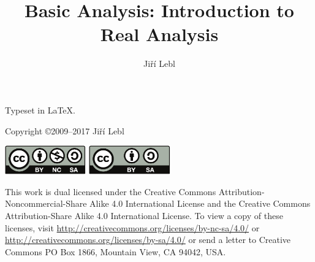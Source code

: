 \documentclass[12pt]{book}
\author{Ji\v{r}\'i Lebl}
\title{Basic Analysis: Introduction to Real Analysis}
\theoremstyle{plain}
\theoremstyle{remark}
\theoremstyle{definition}
\theoremstyle{exercise}
\theoremstyle{example}
\begin{document}
\ifpdf
\fi
\newlength{\centeroffset}
\setlength{\centeroffset}{-0.5\oddsidemargin}
\addtolength{\centeroffset}{0.5\evensidemargin}
\thispagestyle{empty}
\noindent\hspace*{\centeroffset}

\noindent\hspace*{\centeroffset}



\pagebreak

\vspace*{\fill}

\noindent
Typeset in \LaTeX.


\bigskip

\noindent
Copyright \copyright 2009--2017 Ji{\v r}\'i Lebl


\bigskip

\noindent
\includegraphics[width=1.38in]{figures/license}
\quad
\includegraphics[width=1.38in]{figures/license2}

\bigskip

\noindent
This work is dual licensed under
the Creative Commons
Attribution-Non\-commercial-Share Alike 4.0 International License and
the Creative Commons
Attribution-Share Alike 4.0 International License.
To view a
copy of these licenses, visit
\url{http://creativecommons.org/licenses/by-nc-sa/4.0/}
or
\url{http://creativecommons.org/licenses/by-sa/4.0/}
or send a letter to
Creative Commons
PO Box 1866, Mountain View, CA 94042, USA.
\end{document}
